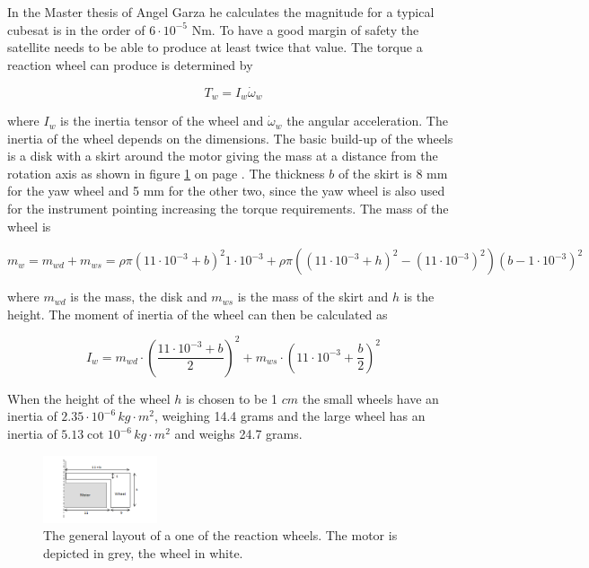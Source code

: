In the Master thesis of Angel Garza \cite{wheelmotor} he calculates the magnitude for a typical cubesat is in the order of $6\cdot 10^{-5}$ Nm. To have a good margin of safety the satellite needs to be able to produce at least twice that value. The torque a reaction wheel can produce is determined by

\begin{equation}
T_w = I_w \dot{\omega}_w
\label{wheeltorque}
\end{equation}

where $I_w$ is the inertia tensor of the wheel and $\dot{\omega}_w$ the angular acceleration. The inertia of the wheel depends on the dimensions.  The basic build-up of the wheels is a disk with a skirt around the motor giving the mass at a distance from the rotation axis as shown in figure \ref{fig:wheel} on page \pageref{fig:wheel}. The thickness $b$ of the skirt is 8 mm for the yaw wheel and 5 mm for the other two, since the yaw wheel is also used for the instrument pointing increasing the torque requirements. The mass of the wheel is 

\begin{equation}
m_w = m_{wd} + m_{ws} = \rho \pi \left(11\cdot 10^{-3}+b\right)^2 1\cdot 10^{-3} + \rho \pi \left(\left(11\cdot 10^{-3}+h\right)^2 - \left(11\cdot 10^{-3}\right)^2\right)\left(b-1\cdot 10^{-3}\right)^2
\end{equation}

where $m_{wd}$ is the mass, the disk and $m_{ws}$ is the mass of the skirt and $h$ is the height. The moment of inertia of the wheel can then be calculated as

\begin{equation}
I_w =  m_{wd} \cdot \left(\frac{11\cdot 10^{-3}+b}{2}\right)^2  + m_{ws} \cdot \left(11\cdot 10^{-3}+\frac{b}{2}\right)^2
\end{equation}

When the height of the wheel $h$ is chosen to be 1 $cm$ the small wheels have an inertia of $2.35\cdot 10^{-6}\,kg\cdot m^2$, weighing 14.4 grams and the large wheel has an inertia of $5.13 \cot 10^{-6}\,kg\cdot m^2$ and weighs 24.7 grams.

\begin{figure}
\centering
\includegraphics[width=0.3\textwidth, bb=0 0 216px 190px]{chapters/img/reactionwheel.png}
\caption[Basic reaction wheel]{The general layout of a one of the reaction wheels. The motor is depicted in grey, the wheel in white.}
\label{fig:wheel}
\end{figure}

